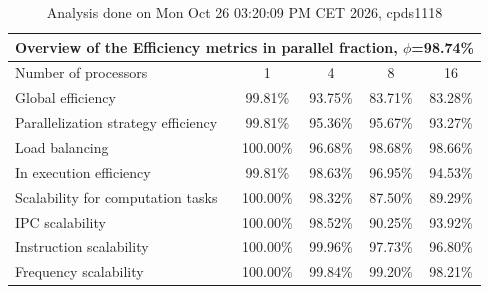 \begin{table}[h]
\begin{center}
\begin{tabular}{|l|c|c|c|c|}
\hline
\multicolumn{5}{|c|}{Overview of the Efficiency metrics in parallel fraction, $\phi$=98.74\%} \\
\hline
\hline
Number of processors & 1 & 4 & 8 & 16 \\
\hline
\hline
Global efficiency                      &     99.81\% &     93.75\% &     83.71\% &     83.28\% \\
\hline
\hline
Parallelization strategy efficiency &     99.81\% &     95.36\% &     95.67\% &     93.27\% \\
\hline
Load balancing                   &    100.00\% &     96.68\% &     98.68\% &     98.66\% \\
In execution efficiency          &     99.81\% &     98.63\% &     96.95\% &     94.53\% \\
\hline
\hline
Scalability for computation tasks   &    100.00\% &     98.32\% &     87.50\% &     89.29\% \\
\hline
IPC scalability                  &    100.00\% &     98.52\% &     90.25\% &     93.92\% \\
Instruction scalability          &    100.00\% &     99.96\% &     97.73\% &     96.80\% \\
Frequency scalability            &    100.00\% &     99.84\% &     99.20\% &     98.21\% \\
\hline
\end{tabular}
\end{center}
\caption{ Analysis done on Mon Oct 26 03:20:09 PM CET 2026, cpds1118}
\end{table}

